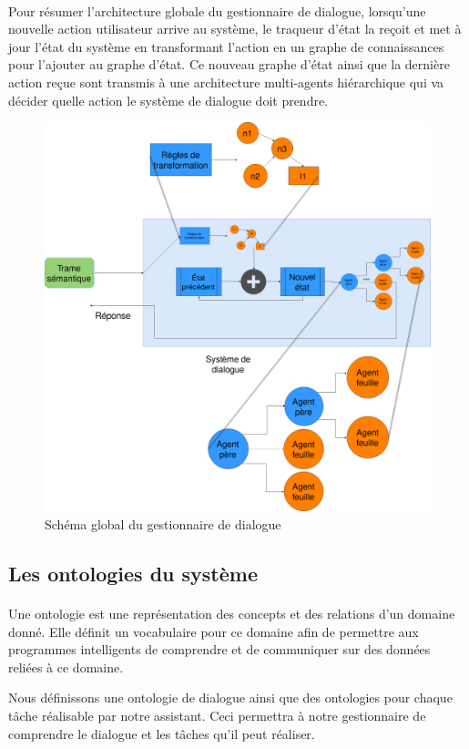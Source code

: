 \paragraph{}
Pour résumer l'architecture globale du gestionnaire de dialogue, lorsqu'une nouvelle action utilisateur arrive au système, le traqueur d'état la reçoit et met à jour l'état du système en transformant l'action en un graphe de connaissances pour l'ajouter au graphe d'état. Ce nouveau graphe d'état ainsi que la dernière action reçue sont transmis à une architecture multi-agents hiérarchique qui va décider quelle action le système de dialogue doit prendre.
\begin{figure}[H] 
	
	\centering
	\includegraphics[width=0.88\linewidth]{images/Conception/DM/globalDM.png}
	\caption{Schéma global du gestionnaire de dialogue}
\end{figure}\label{globalDM}
\subsection{Les ontologies du système}\label{onto}
\paragraph{}Une ontologie est une représentation des concepts et des relations d'un domaine donné. Elle définit un vocabulaire pour ce domaine afin de permettre aux programmes intelligents de comprendre  et de communiquer sur des données reliées à ce domaine.
\par Nous définissons une ontologie de dialogue ainsi que des ontologies pour chaque tâche réalisable par notre assistant. Ceci permettra à notre gestionnaire de comprendre le dialogue et les tâches qu'il peut réaliser.
